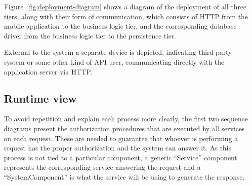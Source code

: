 Figure~\ref{fig:deployment-diagram} shows a diagram of the deployment of all three tiers, along with their form of communication, which consists of HTTP from the mobile application to the business logic tier, and the corresponding database driver from the business logic tier to the persistence tier. 

External to the system a separate device is depicted, indicating third party system or some other kind of API user, communicating directly with the application server via HTTP.

\subsection{Runtime view}
To avoid repetition and explain each process more clearly, the first two sequence diagrams present the authorization procedures that are executed by all services on each request. These are needed to guarantee that whoever is performing a request has the proper authorization and the system can answer it. 
As this process is not tied to a particular component, a generic “Service” component represents the corresponding service answering the request and a “SystemComponent” is what the service will be using to generate the response.

